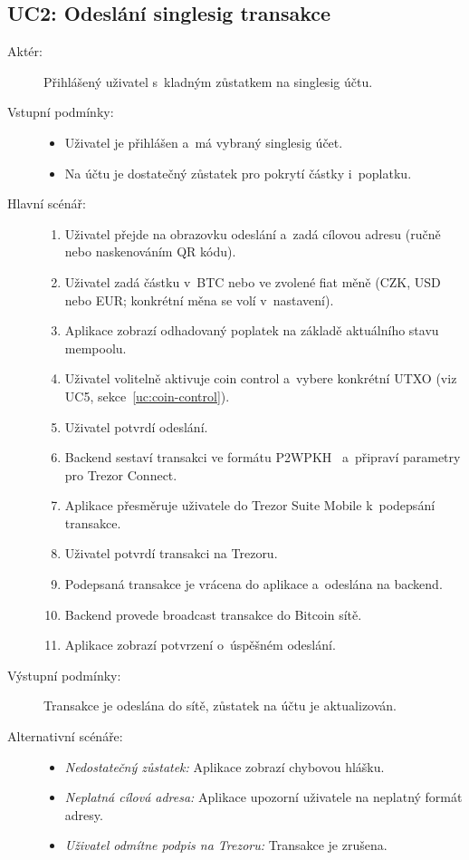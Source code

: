 \subsection{UC2: Odeslání singlesig transakce}
\label{uc:send-singlesig}

\begin{description}
  \item[Aktér:] Přihlášený uživatel s~kladným zůstatkem na singlesig účtu.
  \item[Vstupní podmínky:] \hfill
    \begin{itemize}
      \item Uživatel je přihlášen a~má vybraný singlesig účet.
      \item Na účtu je dostatečný zůstatek pro pokrytí částky i~poplatku.
    \end{itemize}
  \item[Hlavní scénář:] \hfill
    \begin{enumerate}
      \item Uživatel přejde na obrazovku odeslání a~zadá cílovou adresu (ručně nebo
            naskenováním QR kódu).
      \item Uživatel zadá částku v~BTC nebo ve zvolené fiat měně
            (CZK, USD nebo EUR; konkrétní měna se volí v~nastavení).
      \item Aplikace zobrazí odhadovaný poplatek na základě aktuálního stavu mempoolu.
      \item Uživatel volitelně aktivuje coin control a~vybere konkrétní UTXO
            (viz UC5, sekce~\ref{uc:coin-control}).
      \item Uživatel potvrdí odeslání.
      \item Backend sestaví transakci ve formátu P2WPKH~\cite{BIP84} a~připraví
            parametry pro Trezor Connect.
      \item Aplikace přesměruje uživatele do Trezor Suite Mobile k~podepsání
            transakce.
      \item Uživatel potvrdí transakci na Trezoru.
      \item Podepsaná transakce je vrácena do aplikace a~odeslána na backend.
      \item Backend provede broadcast transakce do Bitcoin sítě.
      \item Aplikace zobrazí potvrzení o~úspěšném odeslání.
    \end{enumerate}
  \item[Výstupní podmínky:] Transakce je odeslána do sítě, zůstatek na účtu je
    aktualizován.
  \item[Alternativní scénáře:] \hfill
    \begin{itemize}
      \item \emph{Nedostatečný zůstatek:} Aplikace zobrazí chybovou hlášku.
      \item \emph{Neplatná cílová adresa:} Aplikace upozorní uživatele na neplatný
            formát adresy.
      \item \emph{Uživatel odmítne podpis na Trezoru:} Transakce je zrušena.
    \end{itemize}
\end{description}

